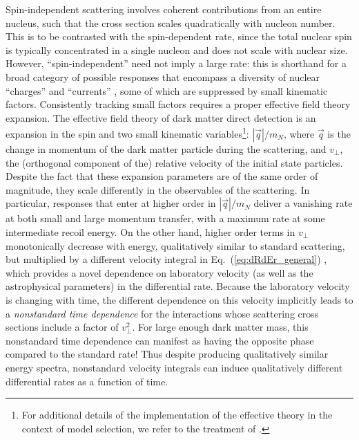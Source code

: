 \documentclass[11pt]{article}
\newcommand{\Eq}[1]{Eq.~(\ref{#1})} \newcommand{\Eqs}[2]{Eqs.~(\ref{#1}) and (\ref{#2})} \newcommand{\Eqm}[2]{Eqs.~(\ref{#1}) through (\ref{#2})}
\begin{document}
Spin-independent scattering involves coherent contributions from an entire nucleus, such that the cross section scales quadratically with nucleon number. This is to be contrasted with the spin-dependent rate, since the total nuclear spin is typically concentrated in a single nucleon and does not scale with nuclear size. However, ``spin-independent'' need not imply a large rate: this is shorthand for a broad category of possible responses that encompass a diversity of nuclear ``charges'' and ``currents'' \cite{Fitzpatrick:2012ix}, some of which are suppressed by small kinematic factors. Consistently tracking small factors requires a proper effective field theory expansion. The effective field theory of dark matter direct detection \cite{Fitzpatrick:2012ix, Anand:2013yka} is an expansion in the spin and two small kinematic variables\footnote{For additional details of the implementation of the effective theory in the context of model selection, we refer to the treatment of \cite{Gluscevic:2015sqa}.}: $|\vec q|/m_N$, where $\vec q$ is the change in momentum of the dark matter particle during the scattering, and $v_\perp$, the (orthogonal component of the) relative velocity of the initial state particles. Despite the fact that these expansion parameters are of the same order of magnitude, they scale differently in the observables of the scattering. In particular, responses that enter at higher order in $|\vec q|/m_N$ deliver a vanishing rate at both small and large momentum transfer, with a maximum rate at some intermediate recoil energy. On the other hand, higher order terms in $v_\perp$ monotonically decrease with energy, qualitatively similar to standard scattering, but multiplied by a different velocity integral in \Eq{eq:dRdEr_general} \cite{Fitzpatrick:2010br}, which provides a novel dependence on laboratory velocity (as well as the astrophysical parameters) in the differential rate. Because the laboratory velocity is changing with time, the different dependence on this velocity implicitly leads to a {\it nonstandard time dependence} for the interactions whose scattering cross sections include a factor of $v_\perp^2$. For large enough dark matter mass, this nonstandard time dependence can manifest as having the opposite phase compared to the standard rate! Thus despite producing qualitatively similar energy spectra, nonstandard velocity integrals can induce qualitatively different differential rates as a function of time.
\end{document}
